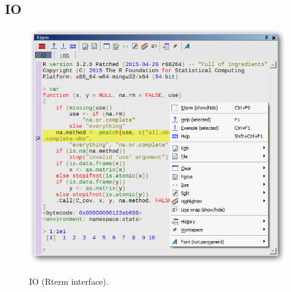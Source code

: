 \hypertarget{working_rterm_io}{}
\subsection{IO}

\begin{figure}[h!]
  \includegraphics[scale=0.35]{./res/rterm_io.png}\\
  \caption{IO (Rterm interface).}
  \label{fig:rterm_io}
\end{figure}

